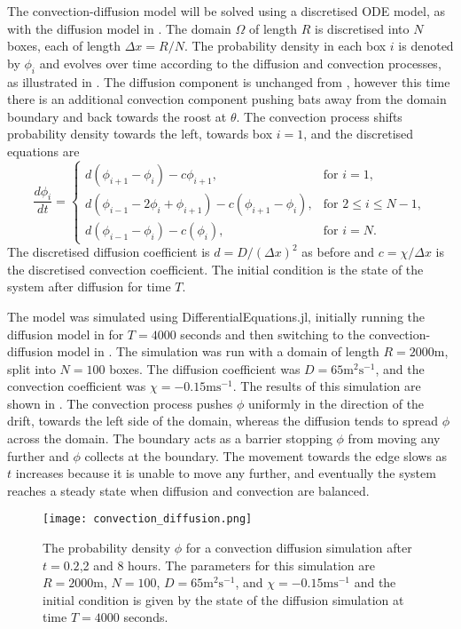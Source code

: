 The convection-diffusion model will be solved using a discretised ODE model, as with the diffusion model in . The domain $\Omega$ of length $R$ is discretised into $N$ boxes, each of length $\Delta x = R/N$. The probability density in each box $i$ is denoted by $\phi_i$ and evolves over time according to the diffusion and convection processes, as illustrated in . The diffusion component is unchanged from , however this time there is an additional convection component pushing bats away from the domain boundary and back towards the roost at $\theta$. The convection process shifts probability density towards the left, towards box $i = 1$, and the discretised equations are
%
\begin{equation}
\frac{d\phi_i}{dt} = \begin{cases}
		d(\phi_{i+1} - \phi_i) - c \phi_{i+1}, & \text{for } i = 1, \\
		d(\phi_{i-1}-2\phi_i +\phi_{i+1}) - c(\phi_{i+1}-\phi_{i}), & \text{for } 2 \leq i \leq N-1, \\
		d(\phi_{i-1}-\phi_i) - c(\phi_{i}), & \text{for } i = N.
		\end{cases}
        \label{eqn:discrete_convection}
\end{equation}
%
The discretised diffusion coefficient is $d = D/(\Delta x)^2$ as before and $c=\chi/\Delta x$ is the discretised convection coefficient. The initial condition is the state of the system after diffusion for time $T$.

The model was simulated using DifferentialEquations.jl, initially running the
diffusion model in  for $T = 4000$ seconds and
then switching to the convection-diffusion model in . The
simulation was run with a domain of length $R = 2000$m, split into $N = 100$
boxes. The diffusion coefficient was $D = 65\mathrm{m^2s^{-1}}$, and the convection coefficient
was $\chi =  - 0.15\mathrm{ms^{-1}}$. The results
of this simulation are shown in . The convection process pushes $\phi$ uniformly in the direction of the drift, towards the left side of the domain, whereas the diffusion tends to spread $\phi$ across the domain. The boundary acts as a barrier stopping $\phi$ from moving any further and $\phi$ collects at the boundary. The movement towards the edge slows as $t$ increases because it is unable to move any further, and eventually the system reaches a steady state when diffusion and convection are balanced.

  \begin{figure} [t]
      \centering
          \texttt{[image: convection\_diffusion.png]}
          \caption{The probability density $\phi$ for a convection diffusion simulation after $t = 0.2$,2 and 8 hours. The parameters for this simulation are $R = 2000$m, $N = 100$,
          $D = 65\mathrm{m^2s^{-1}}$, and $\chi = - 0.15\mathrm{ms^{-1}}$ and the initial condition is given by the state of the diffusion simulation at time $T = 4000$ seconds.}
      \label{fig:convection_diffusion}
  \end{figure}
